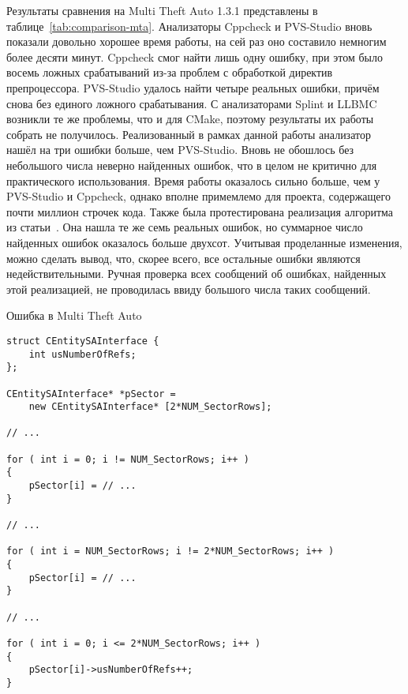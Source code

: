 Результаты сравнения на Multi Theft Auto 1.3.1 представлены в
таблице~\ref{tab:comparison-mta}. Анализаторы Cppcheck и PVS-Studio
вновь показали довольно хорошее время работы, на сей раз оно составило
немногим более десяти минут. Cppcheck смог найти лишь одну ошибку, при
этом было восемь ложных срабатываний из-за проблем с обработкой
директив препроцессора. PVS-Studio удалось найти четыре реальных
ошибки, причём снова без единого ложного срабатывания. С анализаторами
Splint и LLBMC возникли те же проблемы, что и для CMake, поэтому
результаты их работы собрать не получилось. Реализованный в рамках
данной работы анализатор нашёл на три ошибки больше, чем
PVS-Studio. Вновь не обошлось без небольшого числа неверно найденных
ошибок, что в целом не критично для практического использования. Время
работы оказалось сильно больше, чем у PVS-Studio и Cppcheck, однако
вполне примемлемо для проекта, содержащего почти миллион строчек
кода. Также была протестирована реализация алгоритма из
статьи~\cite{li2010practical}. Она нашла те же семь реальных ошибок,
но суммарное число найденных ошибок оказалось больше двухсот. Учитывая
проделанные изменения, можно сделать вывод, что, скорее всего, все
остальные ошибки являются недействительными. Ручная проверка всех
сообщений об ошибках, найденных этой реализацией, не проводилась ввиду
большого числа таких сообщений.

\begin{algorithm}[!h]
\caption{Ошибка в Multi Theft Auto}\label{lst:mta-bug}
\begin{lstlisting}
struct CEntitySAInterface {
    int usNumberOfRefs;
};

CEntitySAInterface* *pSector =
    new CEntitySAInterface* [2*NUM_SectorRows];

// ...

for ( int i = 0; i != NUM_SectorRows; i++ )
{
    pSector[i] = // ...
}

// ...

for ( int i = NUM_SectorRows; i != 2*NUM_SectorRows; i++ )
{
    pSector[i] = // ...
}

// ...

for ( int i = 0; i <= 2*NUM_SectorRows; i++ )
{
    pSector[i]->usNumberOfRefs++;
}

\end{lstlisting}
\end{algorithm}

